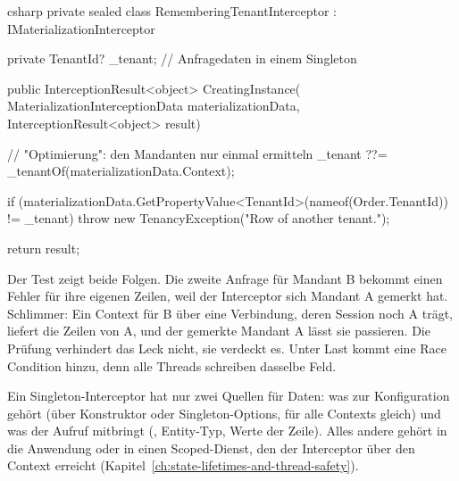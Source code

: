 \begin{sourcecode}{csharp}
private sealed class RememberingTenantInterceptor : IMaterializationInterceptor
{
    private TenantId? _tenant;                       // Anfragedaten in einem Singleton

    public InterceptionResult<object> CreatingInstance(
        MaterializationInterceptionData materializationData,
        InterceptionResult<object> result)
    {
        // "Optimierung": den Mandanten nur einmal ermitteln
        _tenant ??= _tenantOf(materializationData.Context);

        if (materializationData.GetPropertyValue<TenantId>(nameof(Order.TenantId)) != _tenant)
            throw new TenancyException("Row of another tenant.");

        return result;
    }
}
\end{sourcecode}

Der Test zeigt beide Folgen. Die zweite Anfrage für Mandant B bekommt einen Fehler für ihre
eigenen Zeilen, weil der Interceptor sich Mandant A gemerkt hat. Schlimmer: Ein Context für
B über eine Verbindung, deren Session noch A trägt, liefert die Zeilen von A, und der
gemerkte Mandant A lässt sie passieren. Die Prüfung verhindert das Leck nicht, sie verdeckt
es. Unter Last kommt eine Race Condition hinzu, denn alle Threads schreiben dasselbe Feld.

\begin{tip}
  Ein Singleton-Interceptor hat nur zwei Quellen für Daten: was zur Konfiguration gehört
  (über Konstruktor oder Singleton-Options, für alle Contexts gleich) und was der Aufruf
  mitbringt (, Entity-Typ, Werte der Zeile). Alles andere gehört in die
  Anwendung oder in einen Scoped-Dienst, den der Interceptor über den Context erreicht
  (Kapitel~\ref{ch:state-lifetimes-and-thread-safety}).
\end{tip}

